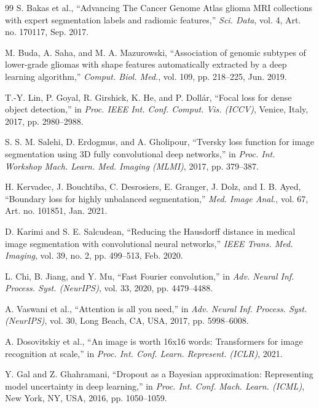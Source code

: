 \documentclass[journal,onecolumn,10pt]{IEEEtran}
\begin{document}
\begin{thebibliography}{99}
S. Bakas et al., ``Advancing The Cancer Genome Atlas glioma MRI collections with expert segmentation labels and radiomic features,'' \textit{Sci. Data}, vol. 4, Art. no. 170117, Sep. 2017.

M. Buda, A. Saha, and M. A. Mazurowski, ``Association of genomic subtypes of lower-grade gliomas with shape features automatically extracted by a deep learning algorithm,'' \textit{Comput. Biol. Med.}, vol. 109, pp. 218--225, Jun. 2019.

T.-Y. Lin, P. Goyal, R. Girshick, K. He, and P. Doll\'{a}r, ``Focal loss for dense object detection,'' in \textit{Proc. IEEE Int. Conf. Comput. Vis. (ICCV)}, Venice, Italy, 2017, pp. 2980--2988.

S. S. M. Salehi, D. Erdogmus, and A. Gholipour, ``Tversky loss function for image segmentation using 3D fully convolutional deep networks,'' in \textit{Proc. Int. Workshop Mach. Learn. Med. Imaging (MLMI)}, 2017, pp. 379--387.

H. Kervadec, J. Bouchtiba, C. Desrosiers, E. Granger, J. Dolz, and I. B. Ayed, ``Boundary loss for highly unbalanced segmentation,'' \textit{Med. Image Anal.}, vol. 67, Art. no. 101851, Jan. 2021.

D. Karimi and S. E. Salcudean, ``Reducing the Hausdorff distance in medical image segmentation with convolutional neural networks,'' \textit{IEEE Trans. Med. Imaging}, vol. 39, no. 2, pp. 499--513, Feb. 2020.

L. Chi, B. Jiang, and Y. Mu, ``Fast Fourier convolution,'' in \textit{Adv. Neural Inf. Process. Syst. (NeurIPS)}, vol. 33, 2020, pp. 4479--4488.

A. Vaswani et al., ``Attention is all you need,'' in \textit{Adv. Neural Inf. Process. Syst. (NeurIPS)}, vol. 30, Long Beach, CA, USA, 2017, pp. 5998--6008.

A. Dosovitskiy et al., ``An image is worth 16x16 words: Transformers for image recognition at scale,'' in \textit{Proc. Int. Conf. Learn. Represent. (ICLR)}, 2021.

Y. Gal and Z. Ghahramani, ``Dropout as a Bayesian approximation: Representing model uncertainty in deep learning,'' in \textit{Proc. Int. Conf. Mach. Learn. (ICML)}, New York, NY, USA, 2016, pp. 1050--1059.


\end{thebibliography}
\end{document}
